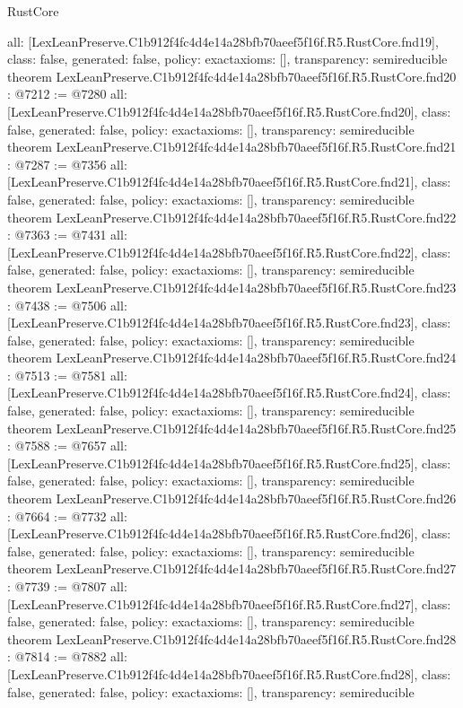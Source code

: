 \begin{lexlean}{RustCore}
\begin{coremodule}
{  all: [LexLeanPreserve.C1b912f4fc4d4e14a28bfb70aeef5f16f.R5.RustCore.fnd19],
  class: false,
  generated: false,
  policy: exact{axioms: []},
  transparency: semireducible
}
theorem LexLeanPreserve.C1b912f4fc4d4e14a28bfb70aeef5f16f.R5.RustCore.fnd20 : @7212 := @7280 {
  all: [LexLeanPreserve.C1b912f4fc4d4e14a28bfb70aeef5f16f.R5.RustCore.fnd20],
  class: false,
  generated: false,
  policy: exact{axioms: []},
  transparency: semireducible
}
theorem LexLeanPreserve.C1b912f4fc4d4e14a28bfb70aeef5f16f.R5.RustCore.fnd21 : @7287 := @7356 {
  all: [LexLeanPreserve.C1b912f4fc4d4e14a28bfb70aeef5f16f.R5.RustCore.fnd21],
  class: false,
  generated: false,
  policy: exact{axioms: []},
  transparency: semireducible
}
theorem LexLeanPreserve.C1b912f4fc4d4e14a28bfb70aeef5f16f.R5.RustCore.fnd22 : @7363 := @7431 {
  all: [LexLeanPreserve.C1b912f4fc4d4e14a28bfb70aeef5f16f.R5.RustCore.fnd22],
  class: false,
  generated: false,
  policy: exact{axioms: []},
  transparency: semireducible
}
theorem LexLeanPreserve.C1b912f4fc4d4e14a28bfb70aeef5f16f.R5.RustCore.fnd23 : @7438 := @7506 {
  all: [LexLeanPreserve.C1b912f4fc4d4e14a28bfb70aeef5f16f.R5.RustCore.fnd23],
  class: false,
  generated: false,
  policy: exact{axioms: []},
  transparency: semireducible
}
theorem LexLeanPreserve.C1b912f4fc4d4e14a28bfb70aeef5f16f.R5.RustCore.fnd24 : @7513 := @7581 {
  all: [LexLeanPreserve.C1b912f4fc4d4e14a28bfb70aeef5f16f.R5.RustCore.fnd24],
  class: false,
  generated: false,
  policy: exact{axioms: []},
  transparency: semireducible
}
theorem LexLeanPreserve.C1b912f4fc4d4e14a28bfb70aeef5f16f.R5.RustCore.fnd25 : @7588 := @7657 {
  all: [LexLeanPreserve.C1b912f4fc4d4e14a28bfb70aeef5f16f.R5.RustCore.fnd25],
  class: false,
  generated: false,
  policy: exact{axioms: []},
  transparency: semireducible
}
theorem LexLeanPreserve.C1b912f4fc4d4e14a28bfb70aeef5f16f.R5.RustCore.fnd26 : @7664 := @7732 {
  all: [LexLeanPreserve.C1b912f4fc4d4e14a28bfb70aeef5f16f.R5.RustCore.fnd26],
  class: false,
  generated: false,
  policy: exact{axioms: []},
  transparency: semireducible
}
theorem LexLeanPreserve.C1b912f4fc4d4e14a28bfb70aeef5f16f.R5.RustCore.fnd27 : @7739 := @7807 {
  all: [LexLeanPreserve.C1b912f4fc4d4e14a28bfb70aeef5f16f.R5.RustCore.fnd27],
  class: false,
  generated: false,
  policy: exact{axioms: []},
  transparency: semireducible
}
theorem LexLeanPreserve.C1b912f4fc4d4e14a28bfb70aeef5f16f.R5.RustCore.fnd28 : @7814 := @7882 {
  all: [LexLeanPreserve.C1b912f4fc4d4e14a28bfb70aeef5f16f.R5.RustCore.fnd28],
  class: false,
  generated: false,
  policy: exact{axioms: []},
  transparency: semireducible
}
\end{coremodule}
\end{lexlean}
